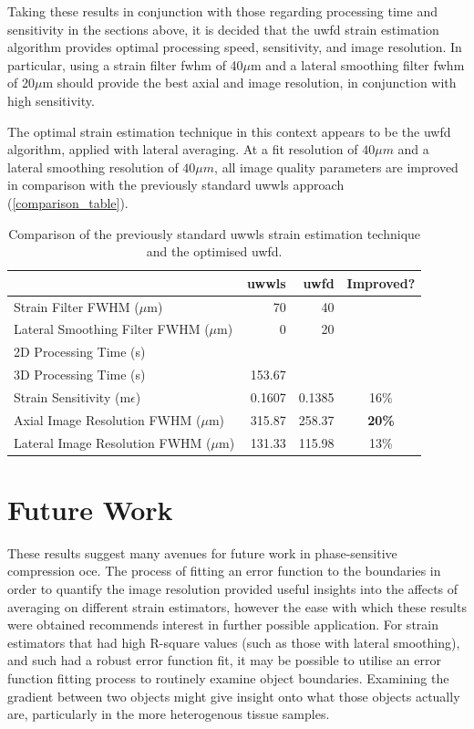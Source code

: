 Taking these results in conjunction with those regarding processing time and sensitivity in the sections above, it is decided that the \ac{uwfd} strain estimation algorithm provides optimal processing speed, sensitivity, and image resolution. In particular, using a strain filter \ac{fwhm} of 40$\mu$m and a lateral smoothing filter \ac{fwhm} of 20$\mu$m should provide the best axial and image resolution, in conjunction with high sensitivity. 

The optimal strain estimation technique in this context appears to be the \ac{uwfd} algorithm, applied with lateral averaging. At a fit resolution of $40\mu m$ and a lateral smoothing resolution of $40\mu m$, all image quality parameters are improved in comparison with the previously standard \ac{uwwls} approach (\autoref{comparison_table}).

\begin{table}[h]
	\begin{tabularx}{\textwidth}{Yrrc}
		\toprule
		& \textbf{\ac{uwwls}} & \textbf{\ac{uwfd}} & \textbf{Improved?}\\
		\midrule 
		Strain Filter FWHM ($\mu$m) & 70 & 40 \\
		Lateral Smoothing Filter FWHM ($\mu$m) & 0 & 20 \\
		\midrule
		2D Processing Time (s) & & \\
		3D Processing Time (s) & 153.67 & \\
		Strain Sensitivity (m$\epsilon$) & 0.1607 & 0.1385 & 16\% \\
		Axial Image Resolution FWHM ($\mu$m) & 315.87 & 258.37 & \textbf{20\%} \\
		Lateral Image Resolution FWHM ($\mu$m) & 131.33 & 115.98 & 13\% \\
		\bottomrule
	\end{tabularx}
	\caption{Comparison of the previously standard \ac{uwwls} strain estimation technique and the optimised \ac{uwfd}.}
	\label{comparison_table}
\end{table}

\section{Future Work}

These results suggest many avenues for future work in phase-sensitive compression \ac{oce}. The process of fitting an error function to the boundaries in order to quantify the image resolution provided useful insights into the affects of averaging on different strain estimators, however the ease with which these results were obtained recommends interest in further possible application. For strain estimators that had high R-square values (such as those with lateral smoothing), and such had a robust error function fit, it may be possible to utilise an error function fitting process to routinely examine object boundaries. Examining the gradient between two objects might give insight onto what those objects actually are, particularly in the more heterogenous tissue samples. 

